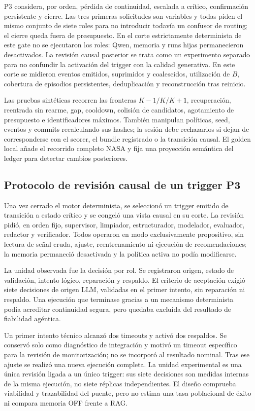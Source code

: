 P3 considera, por orden, pérdida de continuidad, escalada a crítico,
confirmación persistente y cierre. Las tres primeras solicitudes son variables
y todas piden el mismo conjunto de siete roles para no introducir todavía un
confusor de routing; el cierre queda fuera de presupuesto. En el corte
estrictamente determinista de este gate no se ejecutaron los roles: Qwen,
memoria y runs hijas permanecieron desactivados. La revisión causal posterior
se trata como un experimento separado para no confundir la activación del
trigger con la calidad generativa. En este corte se midieron eventos emitidos,
suprimidos y coalescidos, utilización de $B$, cobertura de episodios
persistentes, deduplicación y reconstrucción tras reinicio.

Las pruebas sintéticas recorren las fronteras $K-1/K/K+1$, recuperación,
reentrada sin rearme, gap, cooldown, colisión de candidatos, agotamiento de
presupuesto e identificadores máximos. También manipulan políticas, seed,
eventos y commits recalculando sus hashes; la sesión debe rechazarlos si dejan
de corresponderse con el scorer, el bundle registrado o la transición causal.
El golden local añade el recorrido completo NASA y fija una proyección
semántica del ledger para detectar cambios posteriores.

\subsection{Protocolo de revisión causal de un trigger P3}

Una vez cerrado el motor determinista, se seleccionó un trigger emitido de
transición a estado crítico y se congeló una vista causal en su corte. La
revisión pidió, en orden fijo, supervisor, limpiador, estructurador, modelador,
evaluador, redactor y verificador. Todos operaron en modo exclusivamente
propositivo, sin lectura de señal cruda, ajuste, reentrenamiento ni ejecución de
recomendaciones; la memoria permaneció desactivada y la política activa no
podía modificarse.

La unidad observada fue la decisión por rol. Se registraron origen, estado de
validación, intento lógico, reparación y respaldo. El criterio de aceptación
exigió siete decisiones de origen LLM, validadas en el primer intento, sin
reparación ni respaldo. Una ejecución que terminase gracias a un mecanismo
determinista podía acreditar continuidad segura, pero quedaba excluida del
resultado de fiabilidad agéntica.

Un primer intento técnico alcanzó dos timeouts y activó dos respaldos. Se
conservó solo como diagnóstico de integración y motivó un timeout específico
para la revisión de monitorización; no se incorporó al resultado nominal. Tras
ese ajuste se realizó una nueva ejecución completa. La unidad experimental es
una única revisión ligada a un único trigger: sus siete decisiones son medidas
internas de la misma ejecución, no siete réplicas independientes. El diseño
comprueba viabilidad y trazabilidad del puente, pero no estima una tasa
poblacional de éxito ni compara memoria OFF frente a RAG.

